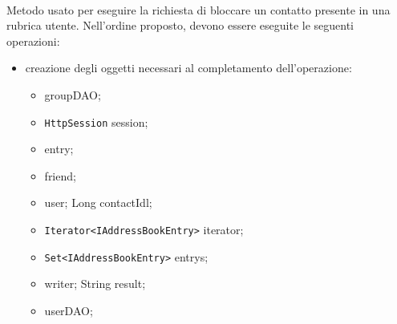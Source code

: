 \begin{description}
	\item{}\\	
	Metodo usato per eseguire la richiesta di bloccare un contatto presente in una rubrica utente. Nell'ordine proposto, devono essere eseguite le seguenti operazioni:
	\begin{itemize}
		\item creazione degli oggetti necessari al completamento dell'operazione:
		\begin{itemize}
			\item {} groupDAO;
			\item \texttt{HttpSession} session;
			\item {} entry;
			\item {} friend;
			\item {} user;
			Long contactIdl;
			\item \texttt{Iterator<IAddressBookEntry>} iterator;
			\item \texttt{Set<IAddressBookEntry>} entrys;
			\item {} writer;
			String result;
			\item {} userDAO;
		\end{itemize}
		

\end{itemize}
\end{description}
